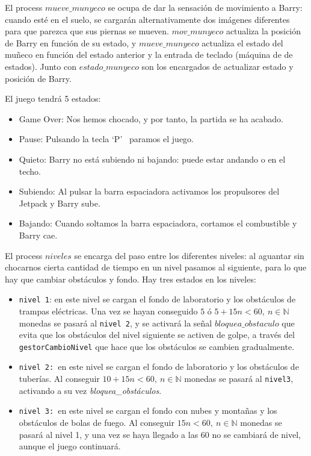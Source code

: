 \documentclass[11pt, a4paper, spanish, openright, twoside]{book}
\begin{document}
El process $mueve\_munyeco$ se ocupa de dar la sensación de movimiento a Barry: cuando esté en el suelo, se cargarán alternativamente dos imágenes diferentes para que parezca que sus piernas se mueven.
$mov\_munyeco$ actualiza la posición de Barry en función de su estado, y $mueve\_munyeco$ actualiza el estado del muñeco en función del estado anterior y la entrada de teclado (máquina de de estados). Junto con $estado\_munyeco$ son los encargados de actualizar estado y posición de Barry.

El juego tendrá 5 estados:
\begin{itemize}
\item Game Over: Nos hemos chocado, y por tanto, la partida se ha acabado.
\item Pause: Pulsando la tecla `P'  \ paramos el juego.
\item Quieto: Barry no está subiendo ni bajando: puede estar andando o en el techo.
\item Subiendo: Al pulsar la barra espaciadora activamos los propulsores del Jetpack y Barry sube.
\item Bajando: Cuando soltamos la barra espaciadora, cortamos el combustible y Barry cae.
\end{itemize}


El process $niveles$ se encarga del paso entre los diferentes niveles: al aguantar sin chocarnos cierta cantidad de tiempo en un nivel pasamos al siguiente, para lo que hay que cambiar obstáculos y fondo.
Hay tres estados en los niveles:
\begin{itemize}
\item \texttt{nivel 1}: en este nivel se cargan el fondo de laboratorio y los obstáculos de trampas eléctricas. Una vez se hayan conseguido $5$ ó  $5+15n<60,\ n\in\mathbb{N}$  monedas se pasará al \texttt{nivel 2}, y se activará la señal $bloquea\_obstaculo$ que evita que los obstáculos del nivel siguiente se activen de golpe, a través del \texttt{gestorCambioNivel} que hace que los obstáculos se cambien gradualmente. 
\item \texttt{nivel 2: }en este nivel se cargan el fondo de laboratorio y los obstáculos de tuberías. Al conseguir  $10+15n<60,\ n\in\mathbb{N}$ monedas se pasará al \texttt{nivel3}, activando a su vez \textit{bloquea\_obstáculos}.
\item \texttt{nivel 3: }en este nivel se cargan el fondo con nubes y montañas y los obstáculos de bolas de fuego. Al conseguir $15n<60,\ n\in\mathbb{N}$ monedas se pasará al nivel 1, y una vez se haya llegado a las 60 no se cambiará de nivel, aunque el juego continuará. 
\end{itemize}
\end{document}
